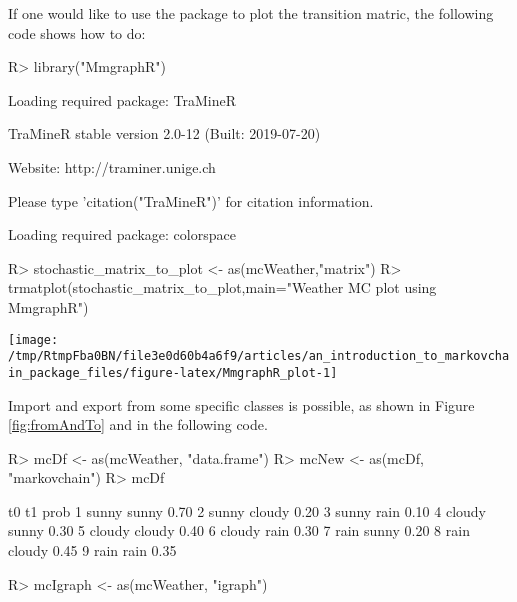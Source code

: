 \documentclass[
  nojss]{jss}
\begin{document}
If one would like to use the  package \citep{pkg:MmgraphR} to plot the transition matric, the following code shows how to do:

\begin{CodeChunk}

\begin{CodeInput}
R> library("MmgraphR")
\end{CodeInput}

\begin{CodeOutput}
Loading required package: TraMineR
\end{CodeOutput}

\begin{CodeOutput}

TraMineR stable version 2.0-12 (Built: 2019-07-20)
\end{CodeOutput}

\begin{CodeOutput}
Website: http://traminer.unige.ch
\end{CodeOutput}

\begin{CodeOutput}
Please type 'citation("TraMineR")' for citation information.
\end{CodeOutput}

\begin{CodeOutput}
Loading required package: colorspace
\end{CodeOutput}

\begin{CodeInput}
R> stochastic_matrix_to_plot <- as(mcWeather,"matrix")
R> trmatplot(stochastic_matrix_to_plot,main="Weather MC plot using MmgraphR")
\end{CodeInput}


\begin{center}\texttt{[image: /tmp/RtmpFba0BN/file3e0d60b4a6f9/articles/an\_introduction\_to\_markovchain\_package\_files/figure-latex/MmgraphR\_plot-1]} \end{center}

\end{CodeChunk}

Import and export from some specific classes is possible, as shown in Figure \ref{fig:fromAndTo} and in the following code.

\begin{CodeChunk}

\begin{CodeInput}
R> mcDf <- as(mcWeather, "data.frame")
R> mcNew <- as(mcDf, "markovchain")
R> mcDf
\end{CodeInput}

\begin{CodeOutput}
      t0     t1 prob
1  sunny  sunny 0.70
2  sunny cloudy 0.20
3  sunny   rain 0.10
4 cloudy  sunny 0.30
5 cloudy cloudy 0.40
6 cloudy   rain 0.30
7   rain  sunny 0.20
8   rain cloudy 0.45
9   rain   rain 0.35
\end{CodeOutput}

\begin{CodeInput}
R> mcIgraph <- as(mcWeather, "igraph")
\end{CodeInput}
\end{CodeChunk}
\end{document}
